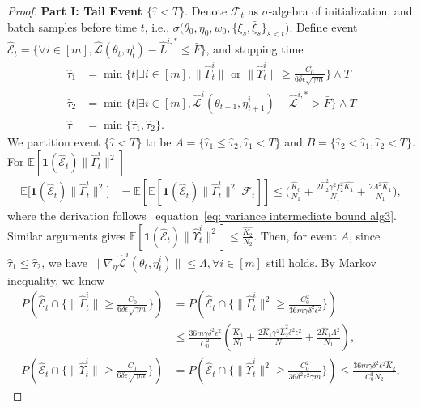 \documentclass[twoside]{article} %
\def\eqref#1{equation~\ref{#1}}
\theoremstyle{plain}
\theoremstyle{definition}
\theoremstyle{remark}
\newcommand{\HGamma}{\hat{\Gamma}}
\newcommand{\HUpsilon}{\hat{\Upsilon}}
\newcommand{\hL}{\hat{L}}
\newcommand{\htau}{\hat{\tau}}
\newcommand{\fhL}{\hat{\mathcal{L}}}
\newcommand{\calhatE}{\mathcal{\hat{E}}}
\begin{document}
\begin{proof} \textbf{Part I: Tail Event $\{\htau<T \}$}. Denote $\mathcal{F}_t$ as $\sigma$-algebra of initialization, and batch samples before time $t$, i.e., $\sigma\big(\theta_0, \eta_0, w_0, \{\xi_s,\bar{\xi}_s\}_{s<t} \big)$. Define event $\calhatE_t = \{\forall i\in[m], \fhL(\theta_t,\eta_t^i) - \hL^{i,*}\leq \bar{F} \}$, and stopping time
    \begin{align}
        \htau_1 &= \min\{t|\exists i\in[m],\|\HGamma^i_{t}\|\text{ or }\|\HUpsilon_t^i\|\geq \frac{C_0}{6\delta\epsilon\sqrt{\gamma m}} \} \wedge T \nonumber\\
        \htau_2 &= \min\{ t|\exists i\in[m], \fhL^i(\theta_{t+1},\eta_{t+1}^i)-\fhL^{i,*}>\bar{F}\}\wedge T\nonumber\\
        \htau &= \min\{\htau_1,\htau_2\}.
    \end{align}
We partition event $\{\htau<T \}$ to be $A= \{\htau_1\leq \htau_2, \htau_1< T \}$ and $B = \{\htau_2< \htau_1, \htau_2<T \}$. 
For $\mathbb{E}[\mathbf{1}(\calhatE_t)\|\HGamma_t^i\|^2]$ 
\begin{align}
    \mathbb{E}\Big[ \mathbf{1}(\calhatE_t) \|\hat{\Gamma}_{t}^i\|^2\Big] &=\mathbb{E}[\mathbb{E}[\mathbf{1}(\calhatE_t) \|\hat{\Gamma}_{t}^i\|^2|\mathcal{F}_t]] \overset{}{\leq} \Big(\frac{\hat{K}_0}{N_1}+\frac{2\hL_2^2\gamma^2f_2^2\hat{K_1}}{N_1}+\frac{2\Lambda^2\hat{K}_1}{N_1}\Big),
\end{align}
where the derivation follows ~\eqref{eq: variance intermediate bound alg3}. Similar arguments gives $\mathbb{E}[\mathbf{1}(\calhatE_t)\|\HUpsilon^i_t\|^2]\leq \frac{\hat{K_2}}{N_2}$. Then, for event $A$, since $\htau_1\leq \htau_2$, we have $\|\nabla_{\eta}\fhL^i(\theta_t,\eta_t^i)\|\leq \Lambda,\forall i\in[m]$ still holds. By Markov inequality, we know
\begin{align}
    P(\calhatE_t \cap\{\|\HGamma_{t}^i\|\geq \frac{C_0}{6\delta\epsilon\sqrt{\gamma   m}}\}) &= P(\calhatE_t\cap \{ \|\HGamma_{t}^i\|^2\geq \frac{{C_0^2}}{36m\gamma \delta^2\epsilon^2 }\})\nonumber\\
    &\leq \frac{36m\gamma\delta^2\epsilon^2}{{C_0^2}}(\frac{\hat{K}_0}{N_1}+\frac{2\hat{K}_1\gamma^2\hL_2^2\delta^2\epsilon^2}{N_1}+\frac{2\hat{K}_1\Lambda^2}{N_1}),\nonumber\\
    P(\calhatE_t \cap \{\|\HUpsilon_t^i\|\geq \frac{C_0}{6\delta\epsilon\sqrt{\gamma m}}\})&= P(\calhatE_t\cap \{ \|\HUpsilon_t^i\|^2\geq \frac{{C_0^2}}{36\delta^2\epsilon^2\gamma m}\})\leq \frac{36 m\gamma\delta^2\epsilon^2\hat{K}_2}{{C_0^2}N_2},
\end{align}

\end{proof}
\end{document}
